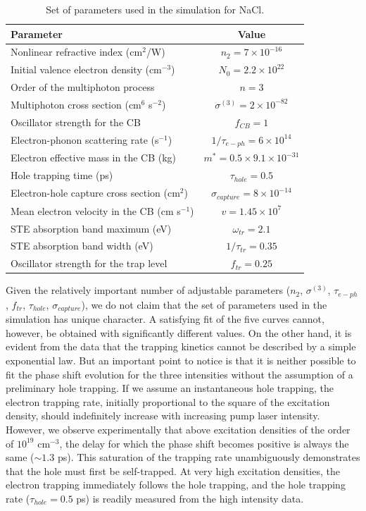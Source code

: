 \documentclass[aps,prb,reprint]{revtex4-2}
\begin{document}
\begin{table}[ht]
\centering
\begin{tabular}{lc}
\toprule
Parameter & Value \\
\midrule
Nonlinear refractive index (cm$^2$/W) & $n_2 = 7\times10^{-16}$ \\
Initial valence electron density (cm$^{-3}$) & $N_0 = 2.2\times10^{22}$ \\
Order of the multiphoton process & $n = 3$ \\
Multiphoton cross section (cm$^6$ s$^{-2}$) & $\sigma^{(3)} = 2\times10^{-82}$ \\
Oscillator strength for the CB & $f_{CB} = 1$ \\
Electron-phonon scattering rate (s$^{-1}$) & $1/\tau_{e-ph} = 6\times10^{14}$ \\
Electron effective mass in the CB (kg) & $m^* = 0.5 \times 9.1\times10^{-31}$ \\
Hole trapping time (ps) & $\tau_{hole} = 0.5$ \\
Electron-hole capture cross section (cm$^2$) & $\sigma_{capture} = 8\times10^{-14}$ \\
Mean electron velocity in the CB (cm s$^{-1}$) & $v = 1.45\times10^{7}$ \\
STE absorption band maximum (eV) & $\omega_{tr} = 2.1$ \\
STE absorption band width (eV) & $1/\tau_{tr} = 0.35$ \\
Oscillator strength for the trap level & $f_{tr} = 0.25$ \\
\bottomrule
\end{tabular}
\caption{Set of parameters used in the simulation for NaCl.}
\label{tab:nacl_params}
\end{table}

Given the relatively important number of adjustable parameters ($n_2$, $\sigma^{(3)}$, $\tau_{e-ph}$, $f_{tr}$, $\tau_{hole}$, $\sigma_{capture}$), we do not claim that the set of parameters used in the simulation has unique character. A satisfying fit of the five curves cannot, however, be obtained with significantly different values. On the other hand, it is evident from the data that the trapping kinetics cannot be described by a simple exponential law. But an important point to notice is that it is neither possible to fit the phase shift evolution for the three intensities without the assumption of a preliminary hole trapping. If we assume an instantaneous hole trapping, the electron trapping rate, initially proportional to the square of the excitation density, should indefinitely increase with increasing pump laser intensity. However, we observe experimentally that above excitation densities of the order of $10^{19}$ cm$^{-3}$, the delay for which the phase shift becomes positive is always the same ($\sim 1.3$ ps). This saturation of the trapping rate unambiguously demonstrates that the hole must first be self-trapped. At very high excitation densities, the electron trapping immediately follows the hole trapping, and the hole trapping rate ($\tau_{hole} = 0.5$ ps) is readily measured from the high intensity data.
\end{document}
